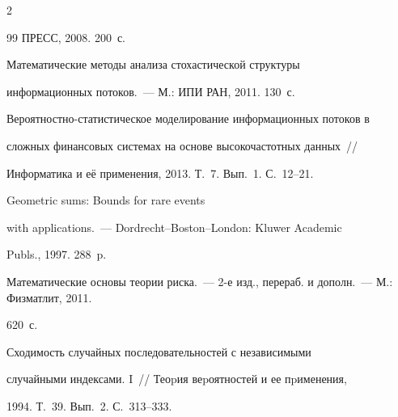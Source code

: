 \begin{multicols}{2}
{{\begin{thebibliography}{99}
ПРЕСС, 2008. 200~с.









Математические методы анализа стохастической структуры


информационных потоков.~--- М.: ИПИ РАН, 2011. 130~с.















Ве\-ро\-ят\-но\-ст\-но-ста\-ти\-сти\-че\-ское моделирование информационных потоков в


сложных финансовых сис\-те\-мах на основе высокочастотных данных~//


Информатика и её применения, 2013. Т.~7. Вып.~1. С.~12--21.







 Geometric sums: Bounds for rare events


with applications.~--- Dordrecht--Boston--London: Kluwer Academic


Publs., 1997. 288~p.









Математические основы теории риска.~--- 2-е изд., перераб. и дополн.~--- М.: Физматлит, 2011.


620~с.







 Сходимость случайных последовательностей с независимыми


случайными индексами. I~// Теоpия веpоятностей и ее пpименения,


1994. Т.~39. Вып.~2. С.~313--333.






\end{thebibliography}}}
\end{multicols}
